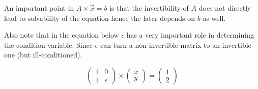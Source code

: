 An important point in $ A \times \vec{x} = b $ is that the invertibility of $A$ does not directly lead to solvability of the equation 
hence the later depends on $b$ as well.

Also note that in the equation below $\epsilon$ has a very important role in determining the condition variable. Since $\epsilon$ can turn a non-invertible matrix
to an invertible one (but ill-conditioned).

\begin{equation*}
  \begin{pmatrix}
    1 & 0 \\
    1 & \epsilon
  \end{pmatrix}
  \times
  \begin{pmatrix}
    x \\
    y
  \end{pmatrix}
  =
  \begin{pmatrix}
    1 \\
    2
  \end{pmatrix}
\end{equation*}
